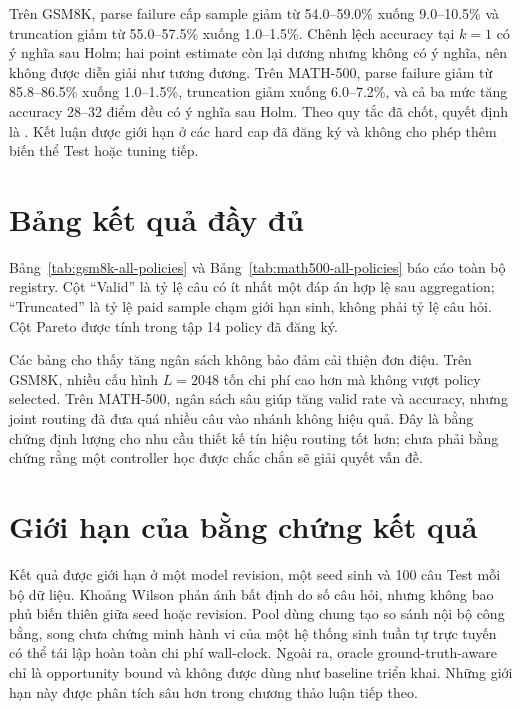 Trên GSM8K, parse failure cấp sample giảm từ 54.0--59.0\% xuống 9.0--10.5\%
và truncation giảm từ 55.0--57.5\% xuống 1.0--1.5\%. Chênh lệch accuracy tại
$k=1$ có ý nghĩa sau Holm; hai point estimate còn lại dương nhưng không có ý
nghĩa, nên không được diễn giải như tương đương. Trên MATH-500, parse failure
giảm từ 85.8--86.5\% xuống 1.0--1.5\%, truncation giảm xuống 6.0--7.2\%, và cả
ba mức tăng accuracy 28--32 điểm đều có ý nghĩa sau Holm. Theo quy tắc đã chốt,
quyết định là . Kết luận được giới hạn ở các
hard cap đã đăng ký và không cho phép thêm biến thể Test hoặc tuning tiếp.

\section{Bảng kết quả đầy đủ}

Bảng~\ref{tab:gsm8k-all-policies} và Bảng~\ref{tab:math500-all-policies} báo
cáo toàn bộ registry. Cột ``Valid'' là tỷ lệ câu có ít nhất một đáp án hợp lệ
sau aggregation; ``Truncated'' là tỷ lệ paid sample chạm giới hạn sinh, không
phải tỷ lệ câu hỏi. Cột Pareto được tính trong tập 14 policy đã đăng ký.


\clearpage


Các bảng cho thấy tăng ngân sách không bảo đảm cải thiện đơn điệu. Trên GSM8K,
nhiều cấu hình $L=2048$ tốn chi phí cao hơn mà không vượt policy selected. Trên
MATH-500, ngân sách sâu giúp tăng valid rate và accuracy, nhưng joint routing
đã đưa quá nhiều câu vào nhánh không hiệu quả. Đây là bằng chứng định lượng cho
nhu cầu thiết kế tín hiệu routing tốt hơn; chưa phải bằng chứng rằng một
controller học được chắc chắn sẽ giải quyết vấn đề.

\section{Giới hạn của bằng chứng kết quả}

Kết quả được giới hạn ở một model revision, một seed sinh và 100 câu Test mỗi
bộ dữ liệu. Khoảng Wilson phản ánh bất định do số câu hỏi, nhưng không bao phủ
biến thiên giữa seed hoặc revision. Pool dùng chung tạo so sánh nội bộ công
bằng, song chưa chứng minh hành vi của một hệ thống sinh tuần tự trực tuyến có
thể tái lập hoàn toàn chi phí wall-clock. Ngoài ra, oracle ground-truth-aware
chỉ là opportunity bound và không được dùng như baseline triển khai. Những
giới hạn này được phân tích sâu hơn trong chương thảo luận tiếp theo.
